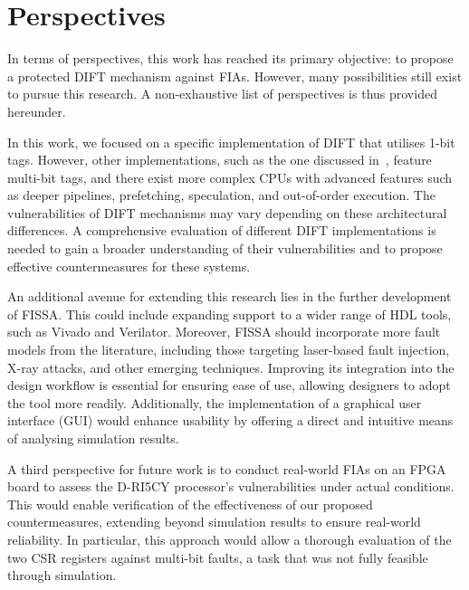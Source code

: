 \section{Perspectives}

In terms of perspectives, this work has reached its primary objective: to propose a protected DIFT mechanism against FIAs. However, many possibilities still exist to pursue this research. A non-exhaustive list of perspectives is thus provided hereunder.

In this work, we focused on a specific implementation of DIFT that utilises 1-bit tags. However, other implementations, such as the one discussed in~\cite{DKK-07-sigarch}, feature multi-bit tags, and there exist more complex CPUs with advanced features such as deeper pipelines, prefetching, speculation, and out-of-order execution. The vulnerabilities of DIFT mechanisms may vary depending on these architectural differences. A comprehensive evaluation of different DIFT implementations is needed to gain a broader understanding of their vulnerabilities and to propose effective countermeasures for these systems.

An additional avenue for extending this research lies in the further development of FISSA. This could include expanding support to a wider range of HDL tools, such as Vivado and Verilator. Moreover, FISSA should incorporate more fault models from the literature, including those targeting laser-based fault injection, X-ray attacks, and other emerging techniques. Improving its integration into the design workflow is essential for ensuring ease of use, allowing designers to adopt the tool more readily. Additionally, the implementation of a graphical user interface (GUI) would enhance usability by offering a direct and intuitive means of analysing simulation results.

A third perspective for future work is to conduct real-world FIAs on an FPGA board to assess the D-RI5CY processor’s vulnerabilities under actual conditions. This would enable verification of the effectiveness of our proposed countermeasures, extending beyond simulation results to ensure real-world reliability. In particular, this approach would allow a thorough evaluation of the two CSR registers against multi-bit faults, a task that was not fully feasible through simulation.

